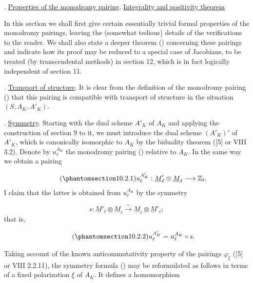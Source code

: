 
\medskip
{}. \underline{Properties of the monodromy pairing}. \underline{Integrality
and positivity theorem}

In this section we shall first give certain essentially trivial formal
properties of the monodromy pairings, leaving the (somewhat tedious)
details of the verifications to the reader. We shall also state a deeper
theorem () concerning these pairings and indicate how its proof may be
reduced to a special case of Jacobians, to be treated (by transcendental
methods) in section 12, which is in fact logically independent of section
11.

\medskip
\noindent
{}. \underline{Transport of structure}. It is clear from the definition
of the monodromy pairing () that this pairing is compatible with
transport of structure in the situation $(S,A_K,A'_K)$.

\medskip
\noindent
{}. \underline{Symmetry}. Starting with the dual scheme $A'_K$ of $A_K$
and applying the construction of section 9 to it, we must introduce the
dual scheme $(A'_K)'$ of $A'_K$, which is canonically isomorphic to $A_K$
by the biduality theorem ([5] or VIII 3.2). Denote by
$u_\ell^{A_K}$ the monodromy pairing () relative to $A_K$. In the same
way we obtain a pairing

\begin{equation}\tag{\SGARefTarget{sga7.sga7i.eix.n10-2-1}{10.2.1}}
u_\ell^{A'_K}:\underline M'_\ell\otimes\underline M_\ell
 \longrightarrow\mathbb Z_\ell.
\end{equation}
I claim that the latter is obtained from $u_\ell^{A_K}$ by the symmetry

\begin{equation*}
s:\underline M'_\ell\otimes\underline M_\ell
 \xrightarrow{\ \sim\ }
 \underline M_\ell\otimes\underline M'_\ell;
\end{equation*}
that is,

\begin{equation}\tag{\SGARefTarget{sga7.sga7i.eix.n10-2-2}{10.2.2}}
u_\ell^{A'_K}=u_\ell^{A_K}\circ s.
\end{equation}

Taking account of the known anticommutativity property of the pairings
$\varphi_\xi$ ([5] or VIII 2.2.11), the symmetry formula () may be
reformulated as follows in terms of a fixed polarization $\xi$ of $A_K$.
It defines a homomorphism

